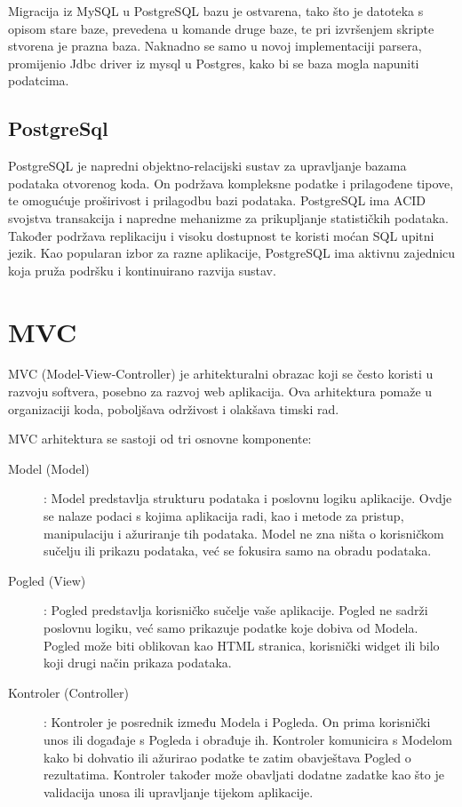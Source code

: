 \documentclass[times, utf8, zavrsni]{fer}
\begin{document}
Migracija iz MySQL u PostgreSQL bazu je ostvarena, tako što je  datoteka s opisom stare baze, prevedena u komande druge baze, te pri izvršenjem skripte 
stvorena je prazna baza. Naknadno se samo u novoj implementaciji parsera, promijenio Jdbc driver iz mysql u Postgres, kako bi se baza mogla napuniti podatcima.
\subsection{PostgreSql}
PostgreSQL je napredni objektno-relacijski sustav za upravljanje bazama podataka otvorenog koda. On podržava kompleksne podatke i prilagođene tipove, te omogućuje proširivost i prilagodbu bazi podataka. PostgreSQL ima ACID svojstva transakcija i napredne mehanizme za prikupljanje statističkih podataka. Također podržava replikaciju i visoku dostupnost te koristi moćan SQL upitni jezik. Kao popularan izbor za razne aplikacije, PostgreSQL ima aktivnu zajednicu koja pruža podršku i kontinuirano razvija sustav.  \cite{postgresql}

\section{MVC}
  MVC (Model-View-Controller) je arhitekturalni obrazac koji se često koristi u razvoju softvera, posebno za razvoj web aplikacija. Ova arhitektura pomaže u organizaciji koda, poboljšava održivost i olakšava timski rad.

MVC arhitektura se sastoji od tri osnovne komponente:

\begin{description}
  \item[Model (Model)] : Model predstavlja strukturu podataka i poslovnu logiku aplikacije. Ovdje se nalaze podaci s kojima aplikacija radi, kao i metode za pristup, manipulaciju i ažuriranje tih podataka. Model ne zna ništa o korisničkom sučelju ili prikazu podataka, već se fokusira samo na obradu podataka.
  
   \item[Pogled (View)] :   Pogled predstavlja korisničko sučelje vaše aplikacije. Pogled ne sadrži poslovnu logiku, već samo prikazuje podatke koje dobiva od Modela. Pogled može biti oblikovan kao HTML stranica, korisnički widget ili bilo koji drugi način prikaza podataka.
 
   \item[Kontroler (Controller)] :  Kontroler je posrednik između Modela i Pogleda. On prima korisnički unos ili događaje s Pogleda i obrađuje ih. Kontroler komunicira s Modelom kako bi dohvatio ili ažurirao podatke te zatim obavještava Pogled o rezultatima. Kontroler također može obavljati dodatne zadatke kao što je validacija unosa ili upravljanje tijekom aplikacije.
\end{description}
\end{document}
